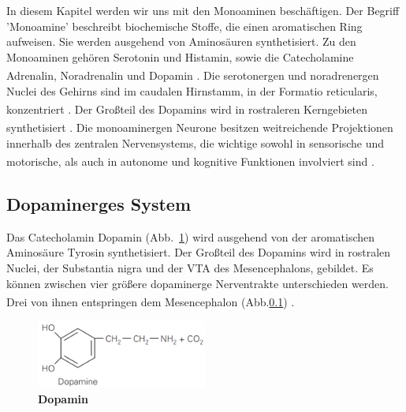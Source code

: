 \documentclass[12pt,a4paper,pdftex]{article}
\begin{document}
In diesem Kapitel werden wir uns mit den Monoaminen beschäftigen.
Der Begriff 'Monoamine'  beschreibt biochemische Stoffe, die einen aromatischen Ring aufweisen. Sie werden ausgehend von Aminosäuren synthetisiert. Zu den Monoaminen gehören Serotonin und Histamin, sowie die Catecholamine Adrenalin, Noradrenalin und Dopamin \textsuperscript{\cite[46]{kandel2013principles}}. Die serotonergen und noradrenergen Nuclei des Gehirns sind im caudalen Hirnstamm, in der Formatio reticularis, konzentriert \textsuperscript{\cite[7]{trepel2011neuroanatomie}}.
Der Großteil des Dopamins wird in rostraleren Kerngebieten synthetisiert \textsuperscript{\cite[63]{kandel2013principles}}.
Die monoaminergen Neurone besitzen weitreichende Projektionen innerhalb des zentralen Nervensystems, die wichtige sowohl in sensorische und motorische, als auch in autonome und kognitive Funktionen involviert sind \textsuperscript{\cite[9]{crossman2014neuroanatomy}}.


\subsection{Dopaminerges System}
\label{dopaminerges_system}
Das Catecholamin Dopamin (Abb.~\ref{fig:dopamin}) wird ausgehend von der aromatischen Aminosäure Tyrosin synthetisiert. Der Großteil des Dopamins wird in rostralen Nuclei, der Substantia nigra  und der VTA des Mesencephalons, gebildet. Es können zwischen vier größere dopaminerge Nerventrakte unterschieden werden. Drei von ihnen entspringen dem Mesencephalon (Abb.\ref{dopaminerges_system}) \textsuperscript{\cite[13]{kandel2013principles}}. 


\begin{figure}[H]
    \centering
    \includegraphics[width=0.5\textwidth]{pictures/Bilder_monoamine_systeme/dopamin.PNG}
    \caption{\textbf{Dopamin}}
    \label{fig:dopamin}
\end{figure}{}
\end{document}
